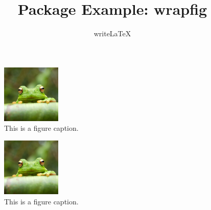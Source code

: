 \documentclass[a4paper]{article}
\title{Package Example: wrapfig}
\author{writeLaTeX}
\begin{document}
\maketitle

\begin{figure}
\centering
\includegraphics[width=0.25\textwidth]{frog.jpg}
\caption{\label{fig:frog1}This is a figure caption.}
\end{figure}

\lipsum[1]

\begin{figure}
\centering
\includegraphics[width=0.25\textwidth]{frog.jpg}
\caption{\label{fig:frog2}This is a figure caption.}
\end{figure}

\lipsum[2-3]
\end{document}

